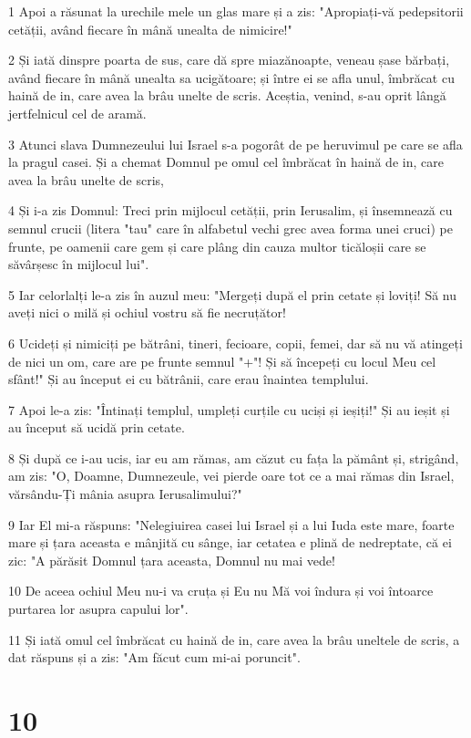 \par 1 Apoi a răsunat la urechile mele un glas mare și a zis: "Apropiați-vă pedepsitorii cetății, având fiecare în mână unealta de nimicire!"
\par 2 Și iată dinspre poarta de sus, care dă spre miazănoapte, veneau șase bărbați, având fiecare în mână unealta sa ucigătoare; și între ei se afla unul, îmbrăcat cu haină de in, care avea la brâu unelte de scris. Aceștia, venind, s-au oprit lângă jertfelnicul cel de aramă.
\par 3 Atunci slava Dumnezeului lui Israel s-a pogorât de pe heruvimul pe care se afla la pragul casei. Și a chemat Domnul pe omul cel îmbrăcat în haină de in, care avea la brâu unelte de scris,
\par 4 Și i-a zis Domnul: Treci prin mijlocul cetății, prin Ierusalim, și însemnează cu semnul crucii (litera "tau" care în alfabetul vechi grec avea forma unei cruci) pe frunte, pe oamenii care gem și care plâng din cauza multor ticăloșii care se săvârșesc în mijlocul lui".
\par 5 Iar celorlalți le-a zis în auzul meu: "Mergeți după el prin cetate și loviți! Să nu aveți nici o milă și ochiul vostru să fie necruțător!
\par 6 Ucideți și nimiciți pe bătrâni, tineri, fecioare, copii, femei, dar să nu vă atingeți de nici un om, care are pe frunte semnul "+"! Și să începeți cu locul Meu cel sfânt!" Și au început ei cu bătrânii, care erau înaintea templului.
\par 7 Apoi le-a zis: "Întinați templul, umpleți curțile cu uciși și ieșiți!" Și au ieșit și au început să ucidă prin cetate.
\par 8 Și după ce i-au ucis, iar eu am rămas, am căzut cu fața la pământ și, strigând, am zis: "O, Doamne, Dumnezeule, vei pierde oare tot ce a mai rămas din Israel, vărsându-Ți mânia asupra Ierusalimului?"
\par 9 Iar El mi-a răspuns: "Nelegiuirea casei lui Israel și a lui Iuda este mare, foarte mare și țara aceasta e mânjită cu sânge, iar cetatea e plină de nedreptate, că ei zic: "A părăsit Domnul țara aceasta, Domnul nu mai vede!
\par 10 De aceea ochiul Meu nu-i va cruța și Eu nu Mă voi îndura și voi întoarce purtarea lor asupra capului lor".
\par 11 Și iată omul cel îmbrăcat cu haină de in, care avea la brâu uneltele de scris, a dat răspuns și a zis: "Am făcut cum mi-ai poruncit".

\chapter{10}

